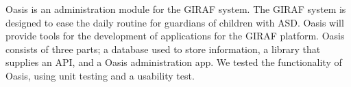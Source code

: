 Oasis is an administration module for the GIRAF system. The GIRAF system is designed to ease the daily routine for guardians of children with ASD. Oasis will provide tools for the development of applications for the GIRAF platform. Oasis consists of three parts; a database used to store information, a library that supplies an API, and a Oasis administration app. We tested the functionality of Oasis, using unit testing and a usability test.